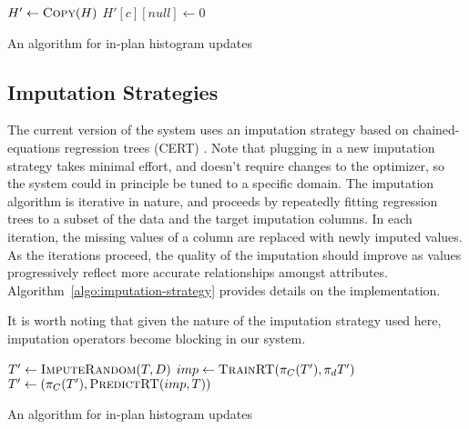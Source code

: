 \begin{algorithm}
  \begin{algorithmic}
    
	\EndIf
	\State $H' \gets \Call{Copy}{H}$
			\State $H'[c][null] \gets 0$
		\EndFor
			\State {}
		\EndFor
		\State {}
		\State {}
	\EndIf
    \EndFunction
  \end{algorithmic}
  \caption{An algorithm for in-plan histogram updates}
  \label{algo:histogram-transformation}
\end{algorithm}

\subsection{Imputation Strategies}
The current version of the system uses an imputation strategy based on chained-equations regression trees (CERT) . Note that plugging in a new
imputation strategy takes minimal effort, and doesn't require changes to the optimizer, so the system could in principle be tuned to a specific domain.
The imputation algorithm is iterative in nature, and proceeds by repeatedly fitting regression trees to a subset of the data and the target imputation columns.
In each iteration, the missing values of a column are replaced with newly imputed values. As the iterations proceed, the quality of the imputation
should improve as values progressively reflect more accurate relationships amongst attributes. Algorithm~\ref{algo:imputation-strategy}
provides details on the implementation.

It is worth noting that given the nature of the imputation strategy used here, imputation operators become blocking in our system.

\begin{algorithm}
  \begin{algorithmic}
    
    	\State $T' \gets \Call{ImputeRandom}{T, D}$
			\State $imp \gets \Call{TrainRT}{\pi_C(T'), \pi_d{T'}}$
			\State $T' \gets (\pi_C(T'), \Call{PredictRT}{imp, T})$
		\EndFor
	\EndFor
	\EndFunction
  \end{algorithmic}
  \caption{An algorithm for in-plan histogram updates}
  \label{algo:histogram-transformation}
\end{algorithm}




